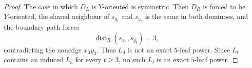 \documentclass[10pt,a4paper]{amsart}
\newcommand{\dist}{\operatorname{dist}}
\begin{document}
\begin{proof}
The case in which $D_L$ is $Y$-oriented is symmetric.  Then $D_R$ is forced to be $Y$-oriented, the shared neighbour of $s_{y_1}$ and $s_{y_2}$ is the same in both dominoes, and the boundary path forces
\[
 \dist_R(s_{x_0},s_{y_3})=3,
\]
contradicting the nonedge $x_0y_3$.  Thus $L_3$ is not an exact $5$-leaf power.  Since $L_t$ contains an induced $L_3$ for every $t\ge3$, no such $L_t$ is an exact $5$-leaf power.
\end{proof}
\end{document}
